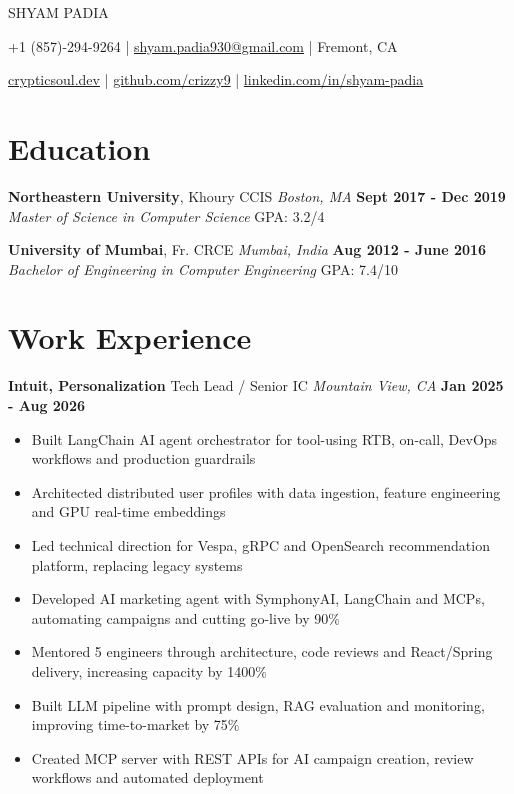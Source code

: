 \documentclass[10pt, letterpaper]{article}
\newcommand{\name}[1]{\centerline{\Large \scshape {#1}}}
\newcommand{\contactinfo}[1]{\centerline{\small #1}}
\newcommand{\educationentry}[4]{
  \noindent\textbf{#1}, #2 \hfill \textit{#3} \hfill \textbf{#4}
}
\newcommand{\jobentry}[4]{
  \noindent\textbf{#1} \hfill #2 \hfill \textit{#3} \hfill \textbf{#4}
}
\begin{document}
\name{SHYAM PADIA}
\contactinfo{
	+1 (857)-294-9264 |
	\href{mailto:shyam.padia930@gmail.com}{shyam.padia930@gmail.com} |
	Fremont, CA
}
\contactinfo{
	\href{https://crypticsoul.dev}{crypticsoul.dev} |
	\href{https://github.com/crizzy9}{github.com/crizzy9} |
	\href{https://linkedin.com/in/shyam-padia}{linkedin.com/in/shyam-padia}
}

\section{Education}

\educationentry{Northeastern University}{Khoury CCIS}{Boston, MA}{Sept 2017 - Dec 2019}\\
\textit{Master of Science in Computer Science} \hfill GPA: 3.2/4


\educationentry{University of Mumbai}{Fr. CRCE}{Mumbai, India}{Aug 2012 - June 2016}\\
\textit{Bachelor of Engineering in Computer Engineering} \hfill GPA: 7.4/10

\section{Work Experience}

\jobentry{Intuit, Personalization}{Tech Lead / Senior IC}{Mountain View, CA}{Jan 2025 - Aug 2026}
\begin{itemize}
	\item Built LangChain AI agent orchestrator for tool-using RTB, on-call, DevOps workflows and production guardrails
	\item Architected distributed user profiles with data ingestion, feature engineering and GPU real-time embeddings
	\item Led technical direction for Vespa, gRPC and OpenSearch recommendation platform, replacing legacy systems
	\item Developed AI marketing agent with SymphonyAI, LangChain and MCPs, automating campaigns and cutting go-live by 90\%
	\item Mentored 5 engineers through architecture, code reviews and React/Spring delivery, increasing capacity by 1400\%
	\item Built LLM pipeline with prompt design, RAG evaluation and monitoring, improving time-to-market by 75\%
	\item Created MCP server with REST APIs for AI campaign creation, review workflows and automated deployment
\end{itemize}
\end{document}
